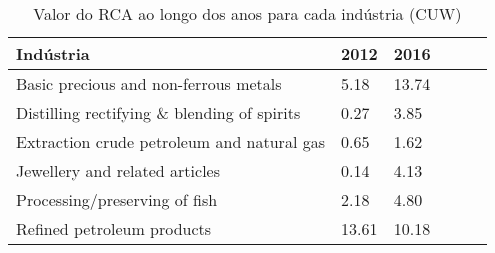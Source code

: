 \begin{table}
\centering
\caption{Valor do RCA ao longo dos anos para cada indústria (CUW)}
\label{tab:ex3-tempo-CUW}
\begin{tabular}{p{6cm}p{1.5cm}p{1.5cm}p{1.5cm}p{1.5cm}p{1.5cm}}
\toprule
                                  Indústria &  2012 &  2016 \\
\midrule
      Basic precious and non-ferrous metals &  5.18 & 13.74 \\
Distilling rectifying \& blending of spirits &  0.27 &  3.85 \\
 Extraction crude petroleum and natural gas &  0.65 &  1.62 \\
             Jewellery and related articles &  0.14 &  4.13 \\
              Processing/preserving of fish &  2.18 &  4.80 \\
                 Refined petroleum products & 13.61 & 10.18 \\
\bottomrule
\end{tabular}
\end{table}
